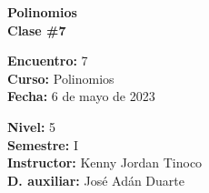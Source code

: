 \begin{center} \textbf
{
    \Large Polinomios \\ \vspace{2mm}Clase \#7
}
\end{center}

\begin{multicols}{2}
{
    \textbf{Encuentro:} 7\\
    \textbf{Curso:} Polinomios\\
    \textbf{Fecha:} 6 de mayo de 2023\\
    \begin{flushright}
        \textbf{Nivel:} 5\\
        \textbf{Semestre:} I\\
        \textbf{Instructor:} Kenny Jordan Tinoco\\
        \textbf{D. auxiliar: }José Adán Duarte
    \end{flushright}
}
\end{multicols}

\thispagestyle{first-page-style}